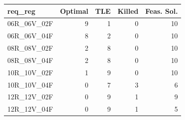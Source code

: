 
\begin{tabular}{lrrrr}
\toprule
req\_reg & Optimal & TLE & Killed & Feas. Sol.\\
\midrule
06R\_06V\_02F & 9 & 1 & 0 & 10\\
06R\_06V\_04F & 8 & 2 & 0 & 10\\
08R\_08V\_02F & 2 & 8 & 0 & 10\\
08R\_08V\_04F & 2 & 8 & 0 & 10\\
10R\_10V\_02F & 1 & 9 & 0 & 10\\
\addlinespace
10R\_10V\_04F & 0 & 7 & 3 & 6\\
12R\_12V\_02F & 0 & 9 & 1 & 9\\
12R\_12V\_04F & 0 & 9 & 1 & 5\\
\bottomrule
\end{tabular}
